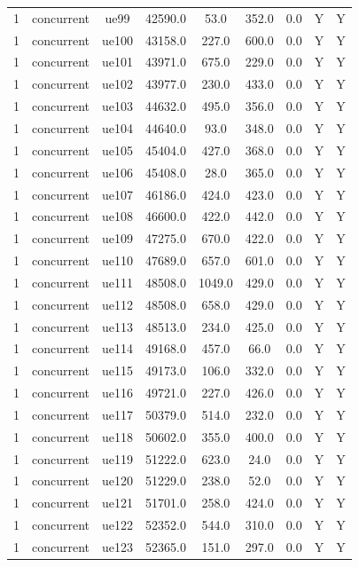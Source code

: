 \begin{table}[ht]
\begin{tabular}{|c|c|c|c|c|c|c|c|c|}
1 & concurrent & ue99 & 42590.0 & 53.0 & 352.0 & 0.0 & Y & Y \\
1 & concurrent & ue100 & 43158.0 & 227.0 & 600.0 & 0.0 & Y & Y \\
1 & concurrent & ue101 & 43971.0 & 675.0 & 229.0 & 0.0 & Y & Y \\
1 & concurrent & ue102 & 43977.0 & 230.0 & 433.0 & 0.0 & Y & Y \\
1 & concurrent & ue103 & 44632.0 & 495.0 & 356.0 & 0.0 & Y & Y \\
1 & concurrent & ue104 & 44640.0 & 93.0 & 348.0 & 0.0 & Y & Y \\
1 & concurrent & ue105 & 45404.0 & 427.0 & 368.0 & 0.0 & Y & Y \\
1 & concurrent & ue106 & 45408.0 & 28.0 & 365.0 & 0.0 & Y & Y \\
1 & concurrent & ue107 & 46186.0 & 424.0 & 423.0 & 0.0 & Y & Y \\
1 & concurrent & ue108 & 46600.0 & 422.0 & 442.0 & 0.0 & Y & Y \\
1 & concurrent & ue109 & 47275.0 & 670.0 & 422.0 & 0.0 & Y & Y \\
1 & concurrent & ue110 & 47689.0 & 657.0 & 601.0 & 0.0 & Y & Y \\
1 & concurrent & ue111 & 48508.0 & 1049.0 & 429.0 & 0.0 & Y & Y \\
1 & concurrent & ue112 & 48508.0 & 658.0 & 429.0 & 0.0 & Y & Y \\
1 & concurrent & ue113 & 48513.0 & 234.0 & 425.0 & 0.0 & Y & Y \\
1 & concurrent & ue114 & 49168.0 & 457.0 & 66.0 & 0.0 & Y & Y \\
1 & concurrent & ue115 & 49173.0 & 106.0 & 332.0 & 0.0 & Y & Y \\
1 & concurrent & ue116 & 49721.0 & 227.0 & 426.0 & 0.0 & Y & Y \\
1 & concurrent & ue117 & 50379.0 & 514.0 & 232.0 & 0.0 & Y & Y \\
1 & concurrent & ue118 & 50602.0 & 355.0 & 400.0 & 0.0 & Y & Y \\
1 & concurrent & ue119 & 51222.0 & 623.0 & 24.0 & 0.0 & Y & Y \\
1 & concurrent & ue120 & 51229.0 & 238.0 & 52.0 & 0.0 & Y & Y \\
1 & concurrent & ue121 & 51701.0 & 258.0 & 424.0 & 0.0 & Y & Y \\
1 & concurrent & ue122 & 52352.0 & 544.0 & 310.0 & 0.0 & Y & Y \\
1 & concurrent & ue123 & 52365.0 & 151.0 & 297.0 & 0.0 & Y & Y \\

\end{tabular}
\end{table}
